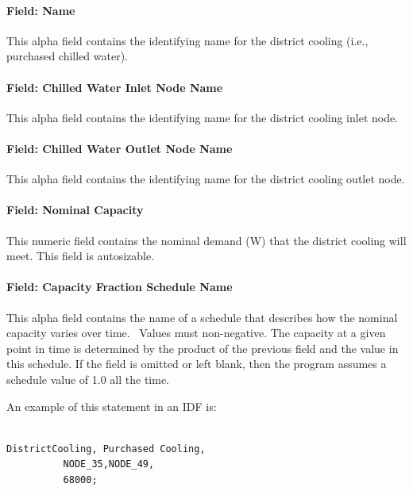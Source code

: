\paragraph{Field: Name}\label{field-name-15-006}

This alpha field contains the identifying name for the district cooling (i.e., purchased chilled water).

\paragraph{Field: Chilled Water Inlet Node Name}\label{field-chilled-water-inlet-node-name-9}

This alpha field contains the identifying name for the district cooling inlet node.

\paragraph{Field: Chilled Water Outlet Node Name}\label{field-chilled-water-outlet-node-name-10}

This alpha field contains the identifying name for the district cooling outlet node.

\paragraph{Field: Nominal Capacity}\label{field-nominal-capacity-10}

This numeric field contains the nominal demand (W) that the district cooling will meet. This field is autosizable.

\paragraph{Field: Capacity Fraction Schedule Name}\label{field-capacity-fraction-schedule-name}

This alpha field contains the name of a schedule that describes how the nominal capacity varies over time.~ Values must non-negative. The capacity at a given point in time is determined by the product of the previous field and the value in this schedule. If the field is omitted or left blank, then the program assumes a schedule value of 1.0 all the time.

An example of this statement in an IDF is:

\begin{lstlisting}

DistrictCooling, Purchased Cooling,
          NODE_35,NODE_49,
          68000;
\end{lstlisting}

